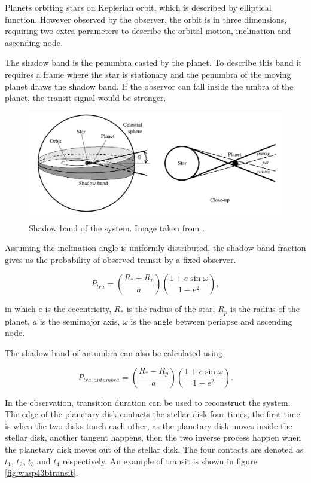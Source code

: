\documentclass[12pt]{article}
\begin{document}
Planets orbiting stars on Keplerian orbit, which is described by elliptical function. However observed by the observer, the orbit is in three dimensions, requiring two extra parameters to describe the orbital motion, inclination and ascending node. 

The shadow band \cite{2010arXiv1001.2010W} is the penumbra casted by the planet. To describe this band it requires a frame where the star is stationary and the penumbra of the moving planet draws the shadow band. If the observor can fall inside the umbra of the planet, the transit signal would be stronger.

\begin{figure}
\centering
\includegraphics[width=\textwidth]{./assets/shadowband}
\caption{Shadow band of the system. Image taken from \cite{2010arXiv1001.2010W}.}
\label{fig:shadowband}
\end{figure}

Assuming the inclination angle is uniformly distributed, the shadow band fraction gives us the probability of observed transit by a fixed observer.\cite{2010arXiv1001.2010W}

\begin{equation}
P_{tra} = \left( \frac{R_* + R_p }{a} \right) \left( \frac{1 + e \sin \omega}{1 - e^2} \right) ,
\end{equation}

in which $e$ is the eccentricity, $R_*$ is the radius of the star, $R_p$ is the radius of the planet, $a$ is the semimajor axis, $\omega$ is the angle between periapse and ascending node.

The shadow band of antumbra can also be calculated using 

\begin{equation}
P_{tra,antumbra} = \left( \frac{R_* - R_p }{a} \right) \left( \frac{1 + e \sin \omega}{1 - e^2} \right) .
\end{equation}

In the observation, transition duration can be used to reconstruct the system. The edge of the planetary disk contacts the stellar disk four times, the first time is when the two disks touch each other, as the planetary disk moves inside the stellar disk, another tangent happens, then the two inverse process happen when the planetary disk moves out of the stellar disk. The four contacts are denoted as $t_1$, $t_2$, $t_3$ and $t_4$ respectively. An example of transit is shown in figure \ref{fig:wasp43btransit}.
\end{document}
